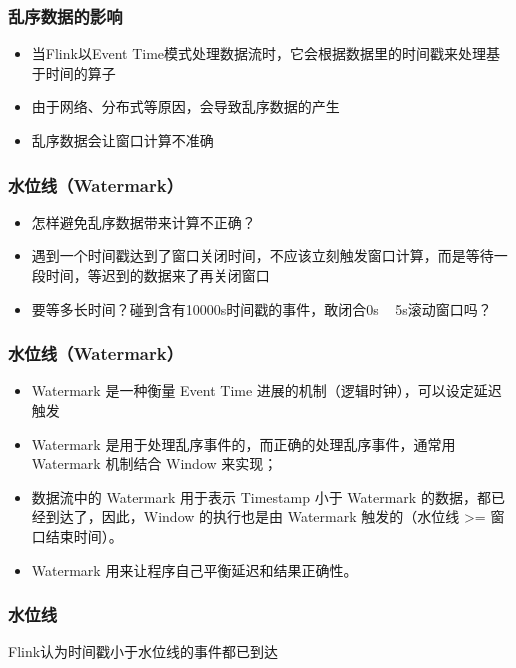 \documentclass{beamer}
\begin{document}
  \begin{frame}
      \frametitle{乱序数据的影响}

      \begin{itemize}
        \item 当Flink以Event Time模式处理数据流时，它会根据数据里的时间戳来处理基于时间的算子
        \item 由于网络、分布式等原因，会导致乱序数据的产生
        \item 乱序数据会让窗口计算不准确
      \end{itemize}
  
  \end{frame}

  \begin{frame}
      \frametitle{水位线（Watermark）}
  
      \begin{itemize}
          \item 怎样避免乱序数据带来计算不正确？
          \item 遇到一个时间戳达到了窗口关闭时间，不应该立刻触发窗口计算，而是等待一段时间，等迟到的数据来了再关闭窗口
          \item 要等多长时间？碰到含有10000s时间戳的事件，敢闭合0s ~ 5s滚动窗口吗？
      \end{itemize}
  
  \end{frame}

  \begin{frame}
      \frametitle{水位线（Watermark）}
  
      \begin{itemize}
          \item Watermark 是一种衡量 Event Time 进展的机制（逻辑时钟），可以设定延迟触发
          \item Watermark 是用于处理乱序事件的，而正确的处理乱序事件，通常用 Watermark 机制结合 Window 来实现；
          \item 数据流中的 Watermark 用于表示 Timestamp 小于 Watermark 的数据，都已经到达了，因此，Window 的执行也是由 Watermark 触发的（水位线 >= 窗口结束时间）。
          \item Watermark 用来让程序自己平衡延迟和结果正确性。
      \end{itemize}
  
  \end{frame}

  \begin{frame}
      \frametitle{水位线}
      \begin{tcolorbox}
      	Flink认为时间戳小于水位线的事件都已到达
      \end{tcolorbox}
  \end{frame}
\end{document}

